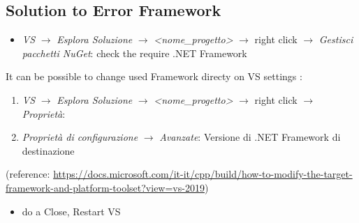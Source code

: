 \documentclass[11pt, english, openany]{report}
\begin{document}
\begin{appendices}
\subsection{Solution to Error Framework}
\begin{itemize}
\item \textit{VS} $\rightarrow$ \textit{Esplora Soluzione} $\rightarrow$ \textit{<nome\_progetto>} $\rightarrow$ right click $\rightarrow$ \textit{Gestisci pacchetti NuGet}: check the require .NET Framework
\end{itemize}
It can be possible to change used Framework directy on VS settings :
\begin{enumerate}
\item \textit{VS} $\rightarrow$ \textit{Esplora Soluzione} $\rightarrow$ \textit{<nome\_progetto>} $\rightarrow$ right click $\rightarrow$ \textit{Proprietà}:
\item \textit{Proprietà di configurazione} $\rightarrow$ \textit{Avanzate}: Versione di .NET Framework di destinazione
\end{enumerate}
(reference: \href{https://docs.microsoft.com/it-it/cpp/build/how-to-modify-the-target-framework-and-platform-toolset?view=vs-2019}{https://docs.microsoft.com/it-it/cpp/build/how-to-modify-the-target-framework-and-platform-toolset?view=vs-2019})
\begin{itemize}
\item do a Close, Restart VS
\end{itemize}


\end{appendices}
\end{document}
